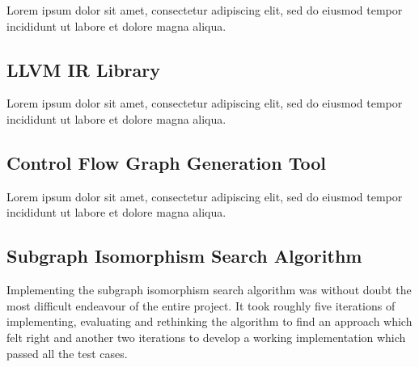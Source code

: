 \documentclass[12pt, a4paper]{article}
\begin{document}


Lorem ipsum dolor sit amet, consectetur adipiscing elit, sed do eiusmod tempor incididunt ut labore et dolore magna aliqua.


\subsection{LLVM IR Library}

Lorem ipsum dolor sit amet, consectetur adipiscing elit, sed do eiusmod tempor incididunt ut labore et dolore magna aliqua.


\subsection{Control Flow Graph Generation Tool}

Lorem ipsum dolor sit amet, consectetur adipiscing elit, sed do eiusmod tempor incididunt ut labore et dolore magna aliqua.


\subsection{Subgraph Isomorphism Search Algorithm}

Implementing the subgraph isomorphism search algorithm was without doubt the most difficult endeavour of the entire project. It took roughly five iterations of implementing, evaluating and rethinking the algorithm to find an approach which felt right and another two iterations to develop a working implementation which passed all the test cases.

\end{document}
